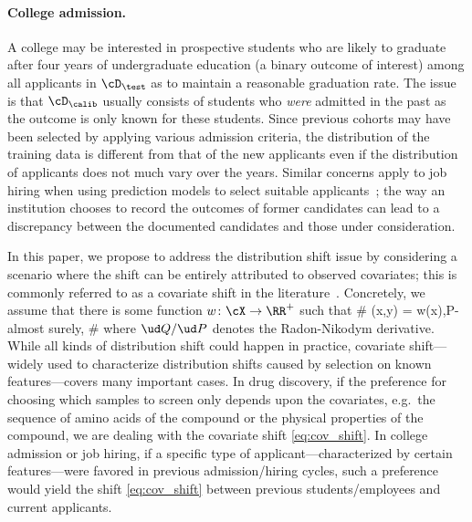 \vspace{-0.3em}

\paragraph{College admission.}
A college may be interested in prospective students who are likely to
graduate after four years of undergraduate education (a binary outcome of interest)
among all applicants in $\cD_\test$ as to maintain a reasonable graduation rate.
The issue is that $\cD_\calib$
usually consists of students who \emph{were} admitted
in the past as the outcome is only known for these students.
Since previous cohorts may have been selected by applying various admission criteria,
the distribution of the training data is different from that of the new applicants
even if the distribution of applicants does not much vary over the years.
Similar concerns apply to job hiring when using prediction models to select suitable applicants~\cite{faliagka2012application,shehu2016adaptive}; the way an institution chooses to record the outcomes of former candidates
can lead to a
discrepancy between the documented candidates and those under
consideration.

\vspace{0.5em}

In this paper,
we propose to address the distribution shift issue
by considering a scenario where the shift
can be entirely attributed to observed covariates; this is
commonly referred to as
a covariate shift in the literature~\cite{sugiyama2007covariate,tibshirani2019conformal}.
%
Concretely, we assume that
there is
some function $w\colon \cX\to \RR^+$ such that
\#\label{eq:cov_shift}
(x,y) = w(x),\quad  P\textrm{-almost surely},
\#
where $ \ud Q/\ud P $ denotes the Radon-Nikodym derivative.
%
While all kinds of distribution shift could happen in practice,
covariate shift---widely used to characterize
distribution shifts
caused by selection on known features---covers many important cases.
In drug discovery, if the preference for choosing which samples
to screen only depends upon the covariates, e.g.~the sequence of amino acids of the compound or the physical properties of the compound, we are dealing with the covariate shift \eqref{eq:cov_shift}.
In college admission or job hiring,
if a specific type of applicant---characterized by certain features---were favored in
previous admission/hiring cycles, such a preference would
yield the shift \eqref{eq:cov_shift} between previous students/employees and current applicants.

